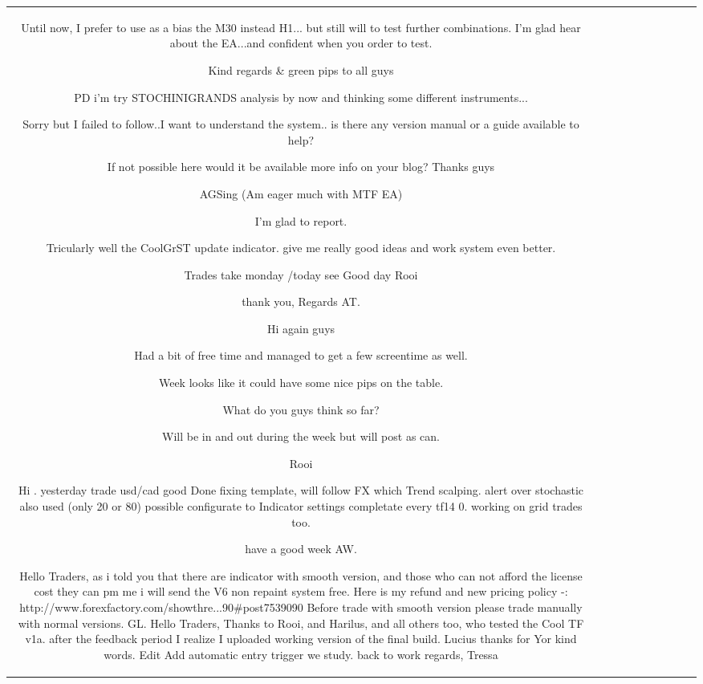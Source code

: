 \begin{table}[h!]
\begin{tabular}{|c|c|c|c|c|c|c|c|c|c|}
Until now, I prefer to use as a bias the M30 instead H1... but still will to test further combinations.
I'm glad hear about the EA...and confident when you order to test.

Kind regards \& green pips to all guys

PD i'm try STOCHINIGRANDS analysis by now and thinking some different instruments... 

Sorry but I failed to follow..I want to understand the system.. is there any version manual or a guide available to help?

If not possible here would it be available more info on your blog?
Thanks guys

AGSing
(Am eager much with MTF EA) 

I'm glad to report.

Tricularly well the CoolGrST update indicator. give me really good ideas and work system even better.

Trades take monday /today see
Good day Rooi

thank you,
Regards AT.

Hi again guys

Had a bit of free time and managed to get a few screentime as well.

Week looks like it could have some nice pips on the table.

What do you guys think so far?

Will be in and out during the week but will post as can.

Rooi


Hi . yesterday trade usd/cad good  Done fixing template, will follow FX which Trend scalping.
alert over stochastic also used (only 20 or 80) possible configurate to Indicator settings completate every tf14 0. working on grid trades too.

have a good week
AW. 

Hello Traders,
as i told you that there are indicator with smooth version, and those who can not afford the license cost they can pm me i will send the V6 non repaint system free. Here is my refund and new pricing policy -: http://www.forexfactory.com/showthre...90#post7539090 Before trade with smooth version please trade manually with normal versions.
GL.
Hello Traders,
Thanks to Rooi, and Harilus, and all others too, who tested the Cool TF v1a. after the feedback period I realize I uploaded working version of the final build.
Lucius thanks for Yor kind words.
Edit Add automatic entry trigger we study.
back to work 
regards, Tressa


\end{tabular}
\end{table}
